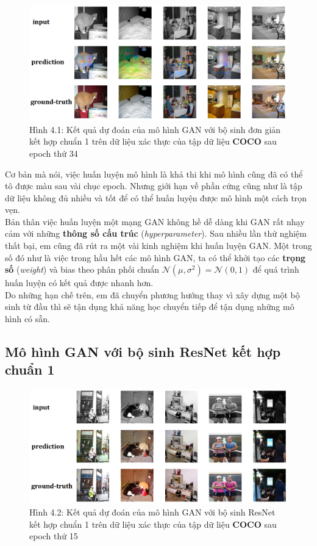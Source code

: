 \documentclass[a4paper]{article}
\begin{document}
\begin{figure}[h!]
\centering
\includegraphics[width=15cm]{images/4_0.png}
\caption{Hình 4.1: Kết quả dự đoán của mô hình GAN với bộ sinh đơn giản kết hợp chuẩn 1 trên dữ liệu xác thực của tập dữ liệu \textbf{COCO} sau epoch thứ 34}
\end{figure}

\noindent
Cơ bản mà nói, việc huấn luyện mô hình là khả thi khi mô hình cũng đã có thể tô được màu sau vài chục epoch. Nhưng giới hạn về phần cứng cũng như là tập dữ liệu không đủ nhiều và tốt để có thể huấn luyện được mô hình một cách trọn vẹn.\\
Bản thân việc huấn luyện một mạng GAN không hề dễ dàng khi GAN rất nhạy cảm với những \textbf{thông số cấu trúc} (\textit{hyperparameter}). Sau nhiều lần thử nghiệm thất bại, em cũng đã rút ra một vài kinh nghiệm khi huấn luyện GAN. Một trong số đó như là việc trong hầu hết các mô hình GAN, ta có thể khởi tạo các \textbf{trọng số} (\textit{weight}) và bias theo phân phối chuẩn $\mathcal{N}\left(\mu, \sigma^2\right) = \mathcal{N}\left(0, 1\right)$ để quá trình huấn luyện có kết quả được nhanh hơn.\\

\noindent
Do những hạn chế trên, em đã chuyển phương hướng thay vì xây dựng một bộ sinh từ đầu thì sẽ tận dụng khả năng học chuyển tiếp để tận dụng những mô hình có sẵn.

\subsection{Mô hình GAN với bộ sinh ResNet kết hợp chuẩn 1}

\begin{figure}[h!]
\centering
\includegraphics[width=15cm]{images/4_1.png}
\caption{Hình 4.2: Kết quả dự đoán của mô hình GAN với bộ sinh ResNet kết hợp chuẩn 1 trên dữ liệu xác thực của tập dữ liệu \textbf{COCO} sau epoch thứ 15}
\end{figure}
\end{document}

